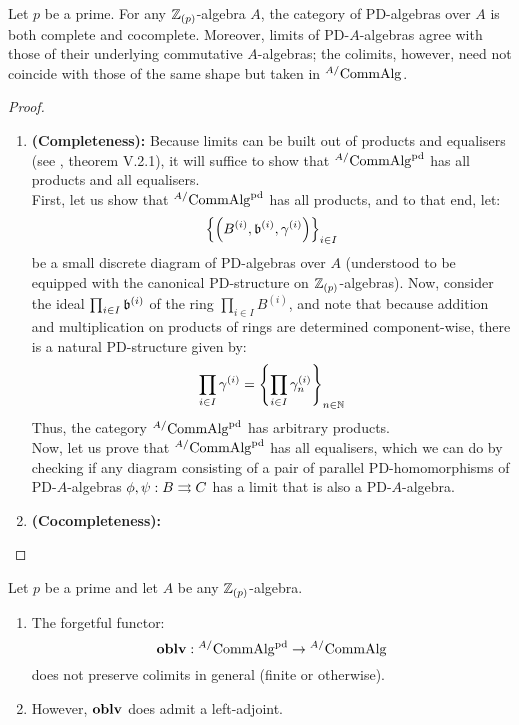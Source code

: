                 \begin{proposition}
                    Let $p$ be a prime. For any $\mathbb{Z}_{(p)}$-algebra $A$, the category of PD-algebras over $A$ is both complete and cocomplete. Moreover, limits of PD-$A$-algebras agree with those of their underlying commutative $A$-algebras; the colimits, however, need not coincide with those of the same shape but taken in ${}^{A/}\mathrm{Comm}\mathrm{Alg}$. 
                \end{proposition}
                    \begin{proof}
                        \noindent
                        \begin{enumerate}
                            \item \textbf{(Completeness):} Because limits can be built out of products and equalisers (see \cite{maclane}, theorem V.2.1), it will suffice to show that ${}^{A/}\mathrm{Comm}\mathrm{Alg}^{\mathrm{pd}}$ has all products and all equalisers.
                            \\
                            First, let us show that ${}^{A/}\mathrm{Comm}\mathrm{Alg}^{\mathrm{pd}}$ has all products, and to that end, let:
                                $$\left\{\left(B^{(i)}, \mathfrak{b}^{(i)}, \gamma^{(i)}\right)\right\}_{i \in I}$$
                            be a small discrete diagram of PD-algebras over $A$ (understood to be equipped with the canonical PD-structure on $\mathbb{Z}_{(p)}$-algebras). Now, consider the ideal $\prod_{i \in I} \mathfrak{b}^{(i)}$ of the ring $\prod_{i \in I} B^{(i)}$, and note that because addition and multiplication on products of rings are determined component-wise, there is a natural PD-structure given by:
                                $$\prod_{i \in I} \gamma^{(i)} = \left\{\prod_{i \in I} \gamma_n^{(i)}\right\}_{n \in \mathbb{N}}$$
                            Thus, the category ${}^{A/}\mathrm{Comm}\mathrm{Alg}^{\mathrm{pd}}$ has arbitrary products. 
                            \\
                            Now, let us prove that ${}^{A/}\mathrm{Comm}\mathrm{Alg}^{\mathrm{pd}}$ has all equalisers, which we can do by checking if any diagram consisting of a pair of parallel PD-homomorphisms of PD-$A$-algebras $\phi, \psi: B \rightrightarrows C$ has a limit that is also a PD-$A$-algebra.  
                            \item \textbf{(Cocompleteness):}
                        \end{enumerate}
                    \end{proof}
                \begin{corollary} \label{coro: free_PD_algebras}
                    Let $p$ be a prime and let $A$ be any $\mathbb{Z}_{(p)}$-algebra. 
                        \begin{enumerate}
                            \item The forgetful functor:
                                $$\mathbf{oblv}: {}^{A/}\mathrm{Comm}\mathrm{Alg}^{\mathrm{pd}} \to {}^{A/}\mathrm{Comm}\mathrm{Alg}$$
                            does not preserve colimits in general (finite or otherwise). 
                            \item However, $\mathbf{oblv}$ does admit a left-adjoint.
                        \end{enumerate}
                \end{corollary}
